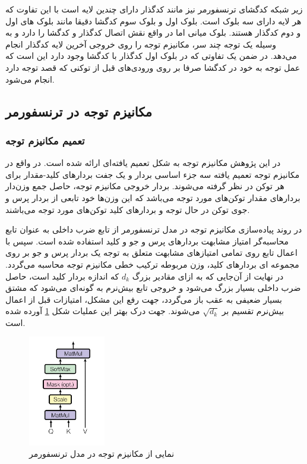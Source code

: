 زیر شبکه کدگشای ترنسفورمر نیز مانند کدگذار دارای چندین لایه است با این تفاوت که هر لایه دارای سه بلوک است. بلوک اول و بلوک سوم کدگشا دقیقا مانند بلوک های اول و دوم کدگذار هستند. بلوک میانی اما در واقع نقش اتصال کدگذار و کدگشا را دارد و به وسیله یک توجه چند سر، مکانیزم توجه را روی خروجی آخرین لایه کدگذار انجام می‌دهد. در ضمن یک تفاوتی که در بلوک اول کدگذار با کدگشا وجود دارد این است که عمل توجه به خود در کدگشا صرفا بر روی ورودی‌های قبل از توکنی که قصد توجه دارد انجام می‌شود.


\subsection{مکانیزم توجه در ترنسفورمر}

\subsubsection{تعمیم مکانیزم توجه}
در این پژوهش مکانیزم توجه به شکل تعمیم یافته‌ای ارائه شده است. در واقع در مکانیزم توجه تعمیم یافته سه جزء اساسی بردار 
و یک جفت بردار‌های کلید-مقدار برای هر توکن در نظر گرفته می‌شوند. بردار خروجی مکانیزم توجه، حاصل جمع‌ وزن‌دار بردارهای مقدار  توکن‌های مورد توجه می‌باشد که این وزن‌ها خود تابعی از بردار 
پرس و جوی توکن در حال توجه و بردارهای کلید توکن‌های مورد توجه می‌باشند.

در روند پیاده‌سازی مکانیزم توجه در مدل ترنسفورمر از تابع ضرب داخلی به عنوان تابع محاسبه‌گر امتیاز مشابهت بردار‌های پرس و جو و کلید استفاده شده است.
سپس با اعمال تابع 
 روی تمامی امتیاز‌های مشابهت متعلق به توجه یک بردار پرس و جو بر روی مجموعه ای بردارهای کلید، وزن مربوطه ترکیب خطی مکانیزم توجه محاسبه می‌گردد. در نهایت از آن‌جایی که به ازای مقادیر بزرگ 
$d_k$
که اندازه بردار کلید است، حاصل ضرب داخلی بسیار بزرگ می‌شود و خروجی تابع 
بیش‌نرم
به گونه‌ای می‌شود که مشتق بسیار ضعیفی به عقب باز‌ می‌گردد، جهت رفع این مشکل، امتیازات قبل از اعمال 
بیش‌نرم
تقسیم بر 
$\sqrt{d_k}$
می‌شوند. جهت درک بهتر این عملیات شکل
\ref{fig:chap3:transformer_attention}
 آورده شده است.

\begin{figure}[h]
	\centering
	\includegraphics[width=0.3\textwidth]{images/chap3/transformer_attention.png}
	\caption[نمایی از مکانیزم نوجه در مدل ترنسفورمر]
	{
		نمایی از مکانیزم توجه در مدل ترنسفورمر
		\cite{transformer}
	}
	\label{fig:chap3:transformer_attention}
\end{figure}

